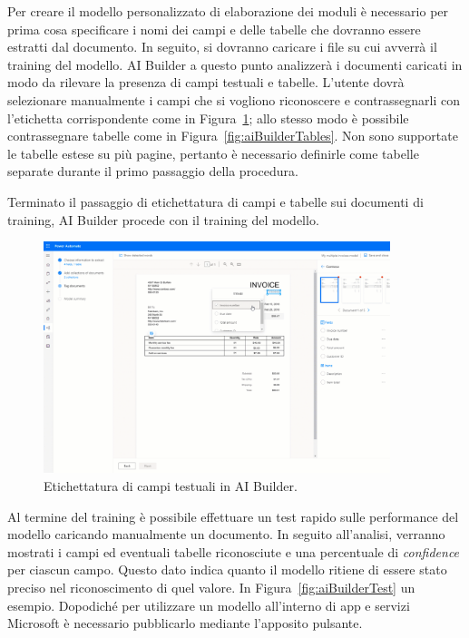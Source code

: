 Per creare il modello personalizzato di elaborazione dei moduli è necessario per prima cosa specificare i nomi dei campi e delle tabelle che dovranno essere estratti dal documento.
In seguito, si dovranno caricare i file su cui avverrà il training del modello. AI Builder a questo punto analizzerà i documenti caricati in modo da rilevare la presenza di campi testuali e tabelle.
L'utente dovrà  selezionare manualmente i campi che si vogliono riconoscere e contrassegnarli con l'etichetta corrispondente come in Figura~\ref{fig:aiBuilderFields}; allo stesso modo è possibile contrassegnare tabelle come in Figura~\ref{fig:aiBuilderTables}. Non sono supportate le tabelle estese su più pagine, pertanto è necessario definirle come tabelle separate durante il primo passaggio della procedura.

Terminato il passaggio di etichettatura di campi e tabelle sui documenti di training, AI Builder procede con il training del modello.

\begin{figure}[ht]
  \centering
  \includegraphics[width=0.9\textwidth]{ai-builder-fields.png}
  \caption{Etichettatura di campi testuali in AI Builder.}
  \label{fig:aiBuilderFields}
\end{figure}

Al termine del training è possibile effettuare un test rapido sulle performance del modello caricando manualmente un documento. In seguito all'analisi, verranno mostrati i campi ed eventuali tabelle riconosciute e una percentuale di \textit{confidence} per ciascun campo. Questo dato indica quanto il modello ritiene di essere stato preciso nel riconoscimento di quel valore. In Figura~\ref{fig:aiBuilderTest} un esempio.
Dopodiché per utilizzare un modello all'interno di app e servizi Microsoft è necessario pubblicarlo mediante l'apposito pulsante.

